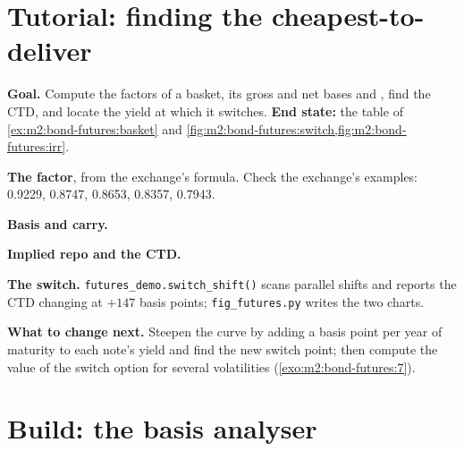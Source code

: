 \section{Tutorial: finding the cheapest-to-deliver}\label{tut:m2:bond-futures:ctd}

\begin{tutorial}
\textbf{Goal.} Compute the factors of a basket, its gross and net bases and
, find the CTD, and locate the yield at which it switches.
\textbf{End state:} the table of \cref{ex:m2:bond-futures:basket} and
\cref{fig:m2:bond-futures:switch,fig:m2:bond-futures:irr}.
\begin{tutsteps}
\item \textbf{The factor}, from the exchange's formula.
\label{lst:m2:bond-futures:cf}
Check the exchange's examples: 0.9229, 0.8747, 0.8653, 0.8357, 0.7943.
\item \textbf{Basis and carry.}
\label{lst:m2:bond-futures:basis}
\item \textbf{Implied repo and the CTD.}
\label{lst:m2:bond-futures:irr}
\item \textbf{The switch.} \texttt{futures\_demo.switch\_shift()} scans
parallel shifts and reports the CTD changing at $+147$ basis points;
\texttt{fig\_futures.py} writes the two charts.
\end{tutsteps}
\textbf{What to change next.} Steepen the curve by adding a basis point per
year of maturity to each note's yield and find the new switch point; then
compute the value of the switch option for several volatilities
(\cref{exo:m2:bond-futures:7}).
\end{tutorial}

\section{Build: the basis analyser}\label{bld:m2:bond-futures:ctd}


